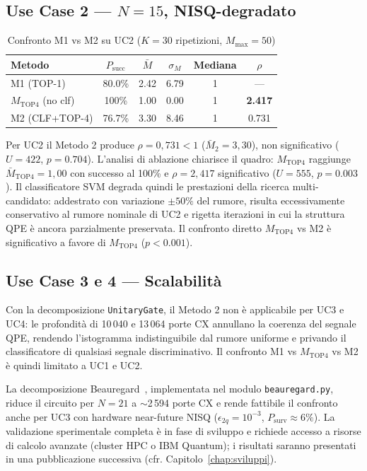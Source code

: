 \begin{onehalfspace}
\subsection{Use Case 2 — $N = 15$, NISQ-degradato}
\label{sec:uc2_m2}

\begin{table}[H]
\centering
\caption{Confronto M1 vs M2 su UC2 ($K=30$ ripetizioni, $M_{\text{max}}=50$)}
\label{tab:confronto_uc2}
\begin{tabular}{lccccc}
\hline
\textbf{Metodo} & \textbf{$P_{\text{succ}}$} & \textbf{$\bar{M}$} & \textbf{$\sigma_M$} & \textbf{Mediana} & \textbf{$\rho$} \\
\hline
M1 (TOP-1)                  & 80.0\% & 2.42 & 6.79 & 1 & --- \\
$M_{\text{TOP4}}$ (no clf)  & 100\%  & 1.00 & 0.00 & 1 & \textbf{2.417} \\
M2 (CLF+TOP-4)              & 76.7\% & 3.30 & 8.46 & 1 & 0.731 \\
\hline
\end{tabular}
\end{table}

Per UC2 il Metodo 2 produce $\rho = 0{,}731 < 1$ ($\bar{M}_2 = 3{,}30$), non significativo ($U = 422$, $p = 0.704$). L'analisi di ablazione chiarisce il quadro: $M_{\text{TOP4}}$ raggiunge $\bar{M}_{\text{TOP4}} = 1{,}00$ con successo al 100\% e $\rho = 2{,}417$ significativo ($U = 555$, $p = 0.003$). Il classificatore \ac{SVM} degrada quindi le prestazioni della ricerca multi-candidato: addestrato con variazione $\pm50\%$ del rumore, risulta eccessivamente conservativo al rumore nominale di UC2 e rigetta iterazioni in cui la struttura QPE è ancora parzialmente preservata. Il confronto diretto $M_{\text{TOP4}}$ vs M2 è significativo a favore di $M_{\text{TOP4}}$ ($p < 0.001$).

\subsection{Use Case 3 e 4 — Scalabilità}
\label{sec:uc34_m2}

Con la decomposizione \texttt{UnitaryGate}, il Metodo 2 non è applicabile per UC3 e UC4: le profondità di 10\,040 e 13\,064 porte CX annullano la coerenza del segnale QPE, rendendo l'istogramma indistinguibile dal rumore uniforme e privando il classificatore di qualsiasi segnale discriminativo. Il confronto M1 vs $M_{\text{TOP4}}$ vs M2 è quindi limitato a UC1 e UC2.

La decomposizione Beauregard~\cite{beauregard2002}, implementata nel modulo \texttt{beauregard.py}, riduce il circuito per $N=21$ a $\sim$2\,594 porte CX e rende fattibile il confronto anche per UC3 con hardware near-future NISQ ($\epsilon_{2q}=10^{-3}$, $P_{\text{surv}}\approx 6\%$). La validazione sperimentale completa è in fase di sviluppo e richiede accesso a risorse di calcolo avanzate (cluster HPC o IBM Quantum); i risultati saranno presentati in una pubblicazione successiva (cfr. Capitolo~\ref{chap:sviluppi}).


\end{onehalfspace}
